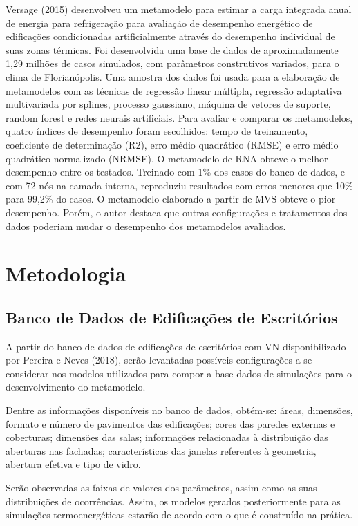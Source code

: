 \documentclass[brazil,hardcopy,openany,a5paper]{ufscthesis}
\begin{document}
	Versage (2015) desenvolveu um metamodelo para estimar a carga integrada anual de energia para refrigeração para avaliação de desempenho energético de edificações condicionadas artificialmente através do desempenho individual de suas zonas térmicas. Foi desenvolvida uma base de dados de aproximadamente 1,29 milhões de casos simulados, com parâmetros construtivos variados, para o clima de Florianópolis. Uma amostra dos dados foi usada para a elaboração de metamodelos com as técnicas de regressão linear múltipla, regressão adaptativa multivariada por splines, processo gaussiano, máquina de vetores de suporte, random forest e redes neurais artificiais. Para avaliar e comparar os metamodelos, quatro índices de desempenho foram escolhidos: tempo de treinamento, coeficiente de determinação (R2), erro médio
	quadrático (RMSE) e erro médio quadrático normalizado (NRMSE). O metamodelo de RNA obteve o melhor desempenho entre os testados. Treinado
	com 1\% dos casos do banco de dados, e com 72 nós na camada interna, reproduziu resultados com erros menores que 10\% para 99,2\% do casos. O metamodelo elaborado a partir de MVS obteve o pior desempenho. Porém, o autor destaca que outras configurações e tratamentos dos dados poderiam mudar o desempenho dos metamodelos avaliados.
	
	\chapter{Metodologia}
	\label{chapter:metodologia}
	
	\section{Banco de Dados de Edificações de Escritórios}
	
	A partir do banco de dados de edificações de escritórios com VN disponibilizado por Pereira e Neves (2018), serão levantadas possíveis configurações a se considerar nos modelos utilizados para compor a base dados de simulações para o desenvolvimento do metamodelo.
	
	Dentre as informações disponíveis no banco de dados, obtém-se: áreas, dimensões, formato e número de pavimentos das edificações; cores das paredes externas e coberturas; dimensões das salas; informações relacionadas à distribuição das aberturas nas fachadas; características das janelas referentes à geometria, abertura efetiva e tipo de vidro.
	
	Serão observadas as faixas de valores dos parâmetros, assim como as suas distribuições de ocorrências. Assim, os modelos gerados posteriormente para as simulações termoenergéticas estarão de acordo com o que é construído na prática.
	
\end{document}
